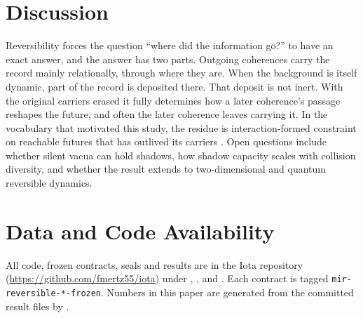 \documentclass{article}
\begin{document}
\section{Discussion}
Reversibility forces the question ``where did the information go?'' to have an exact answer, and
the answer has two parts. Outgoing coherences carry the record mainly relationally, through where
they are. When the background is itself dynamic, part of the record is deposited there. That deposit
is not inert. With the original carriers erased it fully determines how a later coherence's passage
reshapes the future, and often the later coherence leaves carrying it. In the vocabulary that
motivated this study, the residue is interaction-formed constraint on reachable futures that has
outlived its carriers \cite{clark2026icp}. Open questions include whether silent vacua can hold
shadows, how shadow capacity scales with collision diversity, and whether the result extends to
two-dimensional and quantum reversible dynamics.

\section*{Data and Code Availability}
All code, frozen contracts, seals and results are in the Iota repository (\url{https://github.com/fmertz55/iota}) under
, , and
. Each contract is tagged
\texttt{mir-reversible-*-frozen}. Numbers in this paper are generated from the committed result files
by .
\end{document}
